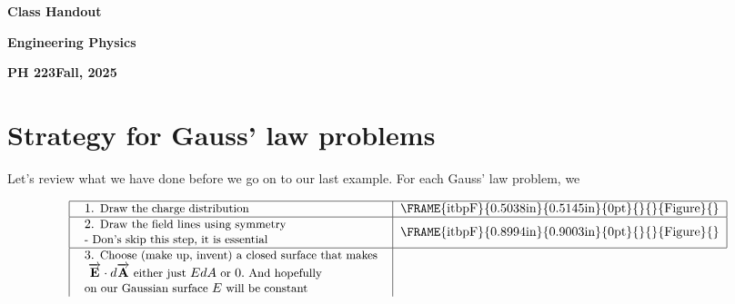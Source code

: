 \documentclass{report}
\begin{document}
\begin{center}
\textbf{Class Handout}

\textbf{Engineering Physics}

\textbf{PH 223\quad Fall, 2025}
\end{center}

\section{Strategy for Gauss' law problems}

Let's review what we have done before we go on to our last example. For each
Gauss' law problem, we

\small%

\begin{equation*}
\begin{tabular}{|l|l|}
\hline
\begin{tabular}{l}
1. {\small Draw the charge distribution }%
\end{tabular}
& \FRAME{itbpF}{0.5038in}{0.5145in}{0pt}{}{}{Figure}{\special{language
"Scientific Word";type "GRAPHIC";maintain-aspect-ratio TRUE;display
"USEDEF";valid_file "T";width 0.5038in;height 0.5145in;depth
0pt;original-width 1.0475in;original-height 1.0706in;cropleft "0";croptop
"1";cropright "1";cropbottom "0";tempfilename
'T3KTF304.wmf';tempfile-properties "XPR";}} \\ \hline
\begin{tabular}{l}
2. {\small Draw the field lines using symmetry} \\ 
{\small - Don's skip this step, it is essential}%
\end{tabular}
& \FRAME{itbpF}{0.8994in}{0.9003in}{0pt}{}{}{Figure}{\special{language
"Scientific Word";type "GRAPHIC";maintain-aspect-ratio TRUE;display
"USEDEF";valid_file "T";width 0.8994in;height 0.9003in;depth
0pt;original-width 1.6551in;original-height 1.656in;cropleft "0";croptop
"1";cropright "1";cropbottom "0";tempfilename
'T3KTF305.wmf';tempfile-properties "XPR";}} \\ \hline
\begin{tabular}{l}
3. {\small Choose (make up, invent) a closed surface that makes} \\ 
{\small \ }$\overrightarrow{\mathbf{E}}\cdot d\overrightarrow{\mathbf{A}}$%
{\small \ either just }$EdA${\small \ or }$0.${\small \ And hopefully } \\ 
{\small on our Gaussian surface }$E${\small \ will be constant}%

\end{tabular}
\end{tabular}
\end{equation*}
\end{document}
